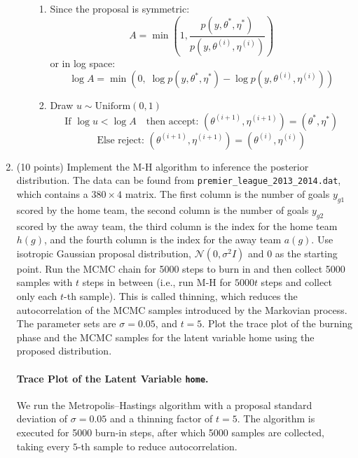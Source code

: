 \documentclass{article}
\begin{document}
\begin{enumerate}
\begin{enumerate}
\begin{enumerate}
      \item {}
      Since the proposal is symmetric:
      \[
      A = \min\left(1, \frac{p(y, \theta^*, \eta^*)}{p(y, \theta^{(i)}, \eta^{(i)})} \right)
      \]
      or in log space:
      \[
      \log A = \min\left(0,\; \log p(y, \theta^*, \eta^*) - \log p(y, \theta^{(i)}, \eta^{(i)}) \right)
      \]
      
      \item {} Draw $u \sim \text{Uniform}(0, 1)$
      \[
      \text{If } \log u < \log A \quad \text{then accept: } (\theta^{(i+1)}, \eta^{(i+1)}) = (\theta^*, \eta^*)
      \]
      \[
      \text{Else reject: } (\theta^{(i+1)}, \eta^{(i+1)}) = (\theta^{(i)}, \eta^{(i)})
      \]
    \end{enumerate}
  \end{enumerate}
  



\item (10 points) Implement the M-H algorithm to inference the posterior distribution. The data can be found
from \texttt{premier\_league\_2013\_2014.dat}, which contains a $380 \times 4$ matrix. The first column is the number
of goals $y_{g1}$ scored by the home team, the second column is the number of goals $y_{g2}$ scored by the away
team, the third column is the index for the home team $h(g)$, and the fourth column is the index for the
away team $a(g)$. Use isotropic Gaussian proposal distribution, $\mathcal{N}(0, \sigma^2I)$ and 0 as the starting point.
Run the MCMC chain for 5000 steps to burn in and then collect 5000 samples with $t$ steps in between
(i.e., run M-H for $5000t$ steps and collect only each $t$-th sample). This is called thinning, which reduces
the autocorrelation of the MCMC samples introduced by the Markovian process. The parameter sets
are $\sigma = 0.05$, and $t = 5$. Plot the trace plot of the burning phase and the MCMC samples for the latent
variable home using the proposed distribution.

\paragraph{Trace Plot of the Latent Variable \texttt{home}.}
We run the Metropolis--Hastings algorithm with a proposal standard deviation of $\sigma = 0.05$ and a thinning factor of $t = 5$. The algorithm is executed for 5000 burn-in steps, after which 5000 samples are collected, taking every $5$-th sample to reduce autocorrelation.


\end{enumerate}
\end{document}
